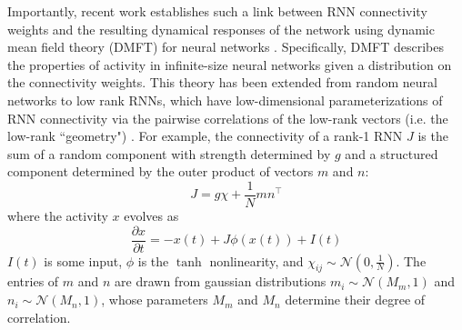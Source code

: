 \documentclass[11pt]{article}
\begin{document}
Importantly, recent work establishes such a link between RNN connectivity weights and the resulting dynamical responses of the network using dynamic mean field theory (DMFT)  for neural networks \cite{sompolinsky1988chaos}.
Specifically, DMFT describes the properties of activity in infinite-size neural networks given a distribution on the connectivity weights.
This theory has been extended from random neural networks to low rank RNNs, which have low-dimensional parameterizations of RNN connectivity via the pairwise correlations of the low-rank vectors (i.e. the low-rank ``geometry")  \cite{mastrogiuseppe2018linking}.  
For example, the connectivity of a rank-1 RNN $J$ is the sum of a random component with strength determined by $g$ and a structured component determined by the outer product of vectors $m$ and $n$:
\begin{equation}
J = g\chi + \frac{1}{N}mn^\top
\end{equation}
where the activity $x$ evolves as
\begin{equation}
\frac{\partial x}{\partial t} = -x(t) + J \phi(x(t)) + I(t)
\end{equation}
$I(t)$ is some input, $\phi$ is the $\tanh$ nonlinearity, and  $\chi_{ij} \sim \mathcal{N}(0, \frac{1}{N})$.  
The entries of $m$ and $n$ are drawn from gaussian distributions $m_i \sim \mathcal{N}(M_m, 1)$ and $n_i \sim \mathcal{N}(M_n, 1)$, whose parameters $M_m$ and $M_n$ determine their degree of correlation.  
\end{document}
